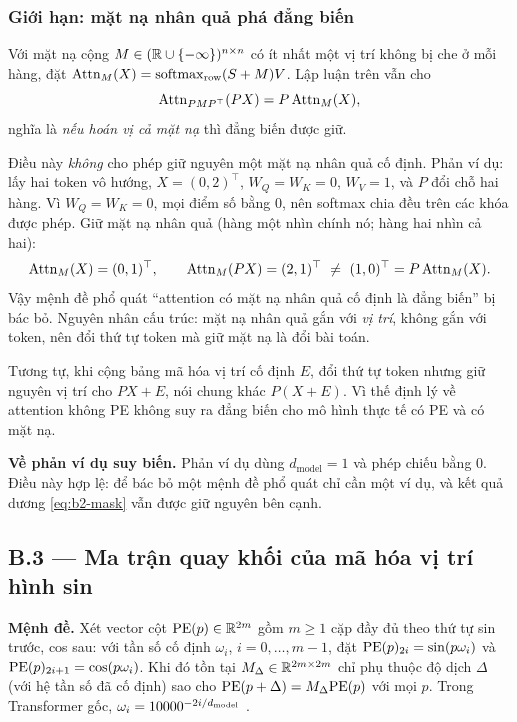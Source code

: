 \subsubsection{Giới hạn: mặt nạ nhân quả phá đẳng biến}

Với mặt nạ cộng $M\in(\mathbb{R}\cup\{-\infty\})^{n\times n}$ có ít nhất một vị trí không
bị che ở mỗi hàng, đặt $\operatorname{Attn}_M(X)=\operatorname{softmax}_{\mathrm{row}}(S+M)V$. Lập luận trên
vẫn cho
\begin{equation}
  \operatorname{Attn}_{PMP^\top}(PX)=P\operatorname{Attn}_M(X),
  \label{eq:b2-mask}
\end{equation}
nghĩa là \emph{nếu hoán vị cả mặt nạ} thì đẳng biến được giữ.

Điều này \emph{không} cho phép giữ nguyên một mặt nạ nhân quả cố định. Phản ví dụ:
lấy hai token vô hướng, $X=(0,2)^\top$, $W_Q=W_K=0$, $W_V=1$, và $P$ đổi chỗ hai
hàng. Vì $W_Q=W_K=0$, mọi điểm số bằng $0$, nên softmax chia đều trên các khóa
được phép. Giữ mặt nạ nhân quả (hàng một nhìn chính nó; hàng hai nhìn cả hai):
\[
  \operatorname{Attn}_M(X)=(0,1)^\top,\qquad
  \operatorname{Attn}_M(PX)=(2,1)^\top\ \ne\ (1,0)^\top=P\operatorname{Attn}_M(X).
\]
Vậy mệnh đề phổ quát ``attention có mặt nạ nhân quả cố định là đẳng biến'' bị bác
bỏ. Nguyên nhân cấu trúc: mặt nạ nhân quả gắn với \emph{vị trí}, không gắn với
token, nên đổi thứ tự token mà giữ mặt nạ là đổi bài toán.

Tương tự, khi cộng bảng mã hóa vị trí cố định $E$, đổi thứ tự token nhưng giữ
nguyên vị trí cho $PX+E$, nói chung khác $P(X+E)$. Vì thế định lý về attention
không PE không suy ra đẳng biến cho mô hình thực tế có PE và có mặt nạ.

\textbf{Về phản ví dụ suy biến.} Phản ví dụ dùng $d_{\mathrm{model}}=1$ và phép
chiếu bằng $0$. Điều này hợp lệ: để bác bỏ một mệnh đề phổ quát chỉ cần một ví dụ,
và kết quả dương \eqref{eq:b2-mask} vẫn được giữ nguyên bên cạnh.

\subsection{B.3 --- Ma trận quay khối của mã hóa vị trí hình sin}
\label{sec:b3}

\textbf{Mệnh đề.} Xét vector cột $\mathrm{PE}(p)\in\mathbb{R}^{2m}$ gồm $m\ge1$ cặp đầy đủ theo
thứ tự sin trước, cos sau: với tần số cố định $\omega_i$, $i=0,\ldots,m-1$, đặt
$\mathrm{PE}(p)_{2i}=\sin(p\omega_i)$ và $\mathrm{PE}(p)_{2i+1}=\cos(p\omega_i)$. Khi đó tồn tại
$M_\Delta\in\mathbb{R}^{2m\times 2m}$ chỉ phụ thuộc độ dịch $\Delta$ (với hệ tần số đã cố
định) sao cho $\mathrm{PE}(p+\Delta)=M_\Delta\mathrm{PE}(p)$ với mọi $p$. Trong Transformer gốc,
$\omega_i=10000^{-2i/d_{\mathrm{model}}}$ \cite[§3.5]{attention}.


